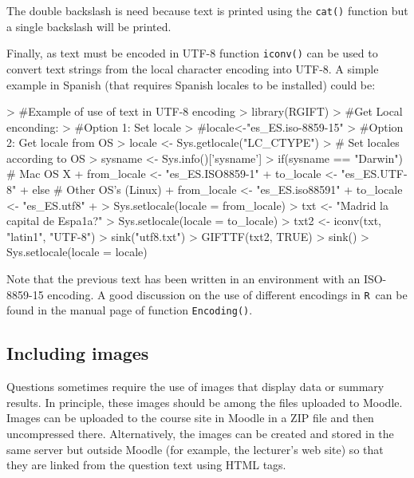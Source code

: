 \documentclass[a4paper]{article}
\newcommand{\RR}{\texttt{R}\ }
\newcommand{\code}[1]{\texttt{#1}}
\begin{document}
\begin{Schunk}
\end{Schunk}
\noindent
The double backslash is need because text is printed using the \code{cat()}
function but a single backslash will be printed.


Finally, as text must be encoded in UTF-8 function \code{iconv()} can be used
to convert  text strings from the local character encoding into UTF-8.
A simple example in Spanish (that requires Spanish locales to be installed) could be:


\begin{Schunk}
\begin{Sinput}
> #Example of use of text in UTF-8 encoding
> library(RGIFT)
> #Get Local enconding:
> #Option 1: Set locale
> #locale<-"es_ES.iso-8859-15"
> #Option 2: Get locale from OS
> locale <- Sys.getlocale("LC_CTYPE")
> # Set locales according to OS
> sysname <- Sys.info()['sysname']
> if(sysname == "Darwin") { # Mac OS X
+   from_locale <- "es_ES.ISO8859-1"
+   to_locale <- "es_ES.UTF-8"
+ } else { # Other OS's (Linux)
+   from_locale <- "es_ES.iso88591"
+   to_locale <- "es_ES.utf8"
+ }
> Sys.setlocale(locale = from_locale)
> txt <- "\xbfEs Madrid la capital de Espa\xf1a?"
> Sys.setlocale(locale = to_locale)
> txt2 <- iconv(txt, "latin1", "UTF-8")
> sink("utf8.txt")
> GIFTTF(txt2, TRUE)
> sink()
> Sys.setlocale(locale = locale)
\end{Sinput}
\end{Schunk}
\noindent
Note that the previous text has been written in an environment with an
ISO-8859-15 encoding. A good discussion on the use of different encodings
in \RR can be found in the manual page of function \code{Encoding()}.



\subsection{Including images}

Questions sometimes require the use of images that display data or summary
results. In principle, these images should be among the files uploaded to
Moodle.  Images can be uploaded to the course site in Moodle in a ZIP file and
then uncompressed there.  Alternatively, the images can be created and stored
in the same server but outside Moodle (for example, the lecturer's web site) so
that they are linked from the question text using HTML tags.
\end{document}
